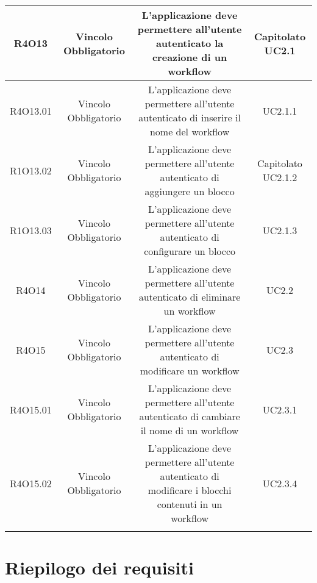 \begin{tabularx}{\textwidth}{|C|C|C|C|}
	\hline
	R4O13&Vincolo Obbligatorio&L'applicazione deve permettere all'utente autenticato la creazione di un workflow& Capitolato UC2.1\\
	\hline
	R4O13.01&Vincolo Obbligatorio& L'applicazione deve permettere all'utente autenticato di inserire il nome del workflow  & UC2.1.1\\
	\hline
	R1O13.02&Vincolo Obbligatorio&L'applicazione deve permettere all'utente autenticato di aggiungere un blocco & Capitolato UC2.1.2\\
	\hline	
	R1O13.03&Vincolo Obbligatorio&L'applicazione deve permettere all'utente autenticato di configurare un blocco&UC2.1.3\\
	\hline
	R4O14&Vincolo Obbligatorio&L'applicazione deve permettere all'utente autenticato di eliminare un workflow&UC2.2\\
	\hline
	R4O15&Vincolo Obbligatorio& L'applicazione deve permettere all'utente autenticato di  modificare un workflow  &UC2.3\\
	\hline
	R4O15.01&Vincolo Obbligatorio& L'applicazione deve permettere all'utente autenticato di cambiare il nome di un workflow  &UC2.3.1\\
	\hline
	R4O15.02&Vincolo Obbligatorio& L'applicazione deve permettere all'utente autenticato di modificare i blocchi contenuti in un workflow  &UC2.3.4\\
	\hline
	\caption{Tabella requisiti di vincolo}
\end{tabularx}

\section{Riepilogo dei requisiti}

